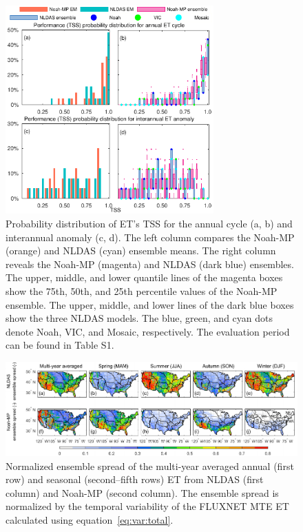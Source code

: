 \documentclass[essd, manuscript]{copernicus}
\begin{document}
\begin{figure}[t]
  \includegraphics[width=8cm]{fig/fig12.pdf}
  \caption{Probability distribution of ET's TSS for the annual cycle (a, b) and interannual anomaly (c, d). The left column compares the Noah-MP (orange) and NLDAS (cyan) ensemble means. The right column reveals the Noah-MP (magenta) and NLDAS (dark blue) ensembles. The upper, middle, and lower quantile lines of the magenta boxes show the 75th, 50th, and 25th percentile values of the Noah-MP ensemble. The upper, middle, and lower lines of the dark blue boxes show the three NLDAS models. The blue, green, and cyan dots denote Noah, VIC, and Mosaic, respectively. The evaluation period can be found in Table S1.}
  \label{fig:et:tss}
\end{figure}

\begin{figure}[t]
  \includegraphics[width=17cm]{fig/fig13.pdf}
  \caption{Normalized ensemble spread of the multi-year averaged annual (first row) and seasonal (second--fifth rows) ET from NLDAS (first column) and Noah-MP (second column). The ensemble spread is normalized by the temporal variability of the FLUXNET MTE ET calculated using equation~\eqref{eq:var:total}.}
  \label{fig:et:spread}
\end{figure}
\end{document}
